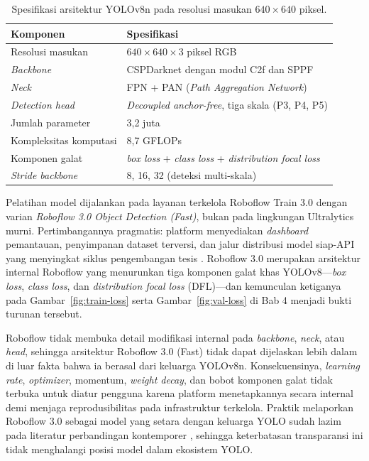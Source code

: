 \begin{table}[H]
\centering
\caption{Spesifikasi arsitektur YOLOv8n pada resolusi masukan $640 \times 640$ piksel.}
\label{tab:arsitektur-yolov8n}
\begin{tabular}{ll}
\hline
\textbf{Komponen} & \textbf{Spesifikasi} \\
\hline
Resolusi masukan       & $640 \times 640 \times 3$ piksel RGB \\
\textit{Backbone}      & CSPDarknet dengan modul C2f dan SPPF \\
\textit{Neck}          & FPN + PAN (\textit{Path Aggregation Network}) \\
\textit{Detection head} & \textit{Decoupled anchor-free}, tiga skala (P3, P4, P5) \\
Jumlah parameter       & 3,2 juta \\
Kompleksitas komputasi & 8,7 GFLOPs \\
Komponen galat         & \textit{box loss} + \textit{class loss} + \textit{distribution focal loss} \\
\textit{Stride backbone} & 8, 16, 32 (deteksi multi-skala) \\
\hline
\end{tabular}
\end{table}

Pelatihan model dijalankan pada layanan terkelola Roboflow Train 3.0 dengan varian \textit{Roboflow 3.0 Object Detection (Fast)}, bukan pada lingkungan Ultralytics murni. Pertimbangannya pragmatis: platform menyediakan \textit{dashboard} pemantauan, penyimpanan dataset terversi, dan jalur distribusi model siap-API yang menyingkat siklus pengembangan tesis \cite{roboflowdocs2025,roboflowblog2023}. Roboflow 3.0 merupakan arsitektur internal Roboflow yang menurunkan tiga komponen galat khas YOLOv8---\textit{box loss}, \textit{class loss}, dan \textit{distribution focal loss} (DFL)---dan kemunculan ketiganya pada Gambar~\ref{fig:train-loss} serta Gambar~\ref{fig:val-loss} di Bab 4 menjadi bukti turunan tersebut.

Roboflow tidak membuka detail modifikasi internal pada \textit{backbone}, \textit{neck}, atau \textit{head}, sehingga arsitektur Roboflow 3.0 (Fast) tidak dapat dijelaskan lebih dalam di luar fakta bahwa ia berasal dari keluarga YOLOv8n. Konsekuensinya, \textit{learning rate}, \textit{optimizer}, momentum, \textit{weight decay}, dan bobot komponen galat tidak terbuka untuk diatur pengguna karena platform menetapkannya secara internal demi menjaga reprodusibilitas pada infrastruktur terkelola. Praktik melaporkan Roboflow 3.0 sebagai model yang setara dengan keluarga YOLO sudah lazim pada literatur perbandingan kontemporer \cite{solano2025roboflow}, sehingga keterbatasan transparansi ini tidak menghalangi posisi model dalam ekosistem YOLO.

